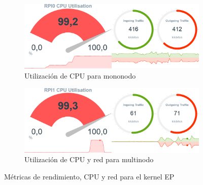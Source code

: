 \begin{figure}[htpb]
    \begin{subfigure}[c]{0.75\textwidth}
        \includegraphics[width=\textwidth]{img/benchmark_rev/ep_rev_sn.png}
        \caption{Utilización de CPU para mononodo}
        \label{fig:mops_rev_sn__ep}
    \end{subfigure}

    \vspace{0.5cm}
    
    \begin{subfigure}[c]{0.75\textwidth}
        \includegraphics[width=\textwidth]{img/benchmark_rev/ep_rev_mn.png}
        \caption{Utilización de CPU y red para multinodo}
        \label{fig:mops_rev_mn__ep}
    \end{subfigure}
    \caption{Métricas de rendimiento, CPU y red para el kernel EP}
    \label{fig:mops__ep}
\end{figure}

